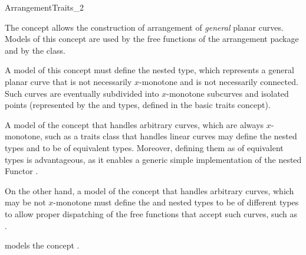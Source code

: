 
\ccRefPageBegin
\begin{ccRefConcept}{ArrangementTraits_2}

\ccDefinition
The concept \ccRefName{} allows the construction of arrangement
of {\sl general} planar curves. Models of this concept are used
by the free  functions of the arrangement package and
by the  class.

A model of this concept must define the nested  type, which
represents a general planar curve that is not necessarily $x$-monotone
and is not necessarily connected. Such curves are eventually subdivided into
$x$-monotone subcurves and isolated points (represented by the 
and  types, defined in the basic traits concept).

A model of the concept \ccRefName{} that handles arbitrary curves,
which are always $x$-monotone, such as a traits class that handles
linear curves may define the nested types  and
 to be of equivalent types. Moreover, defining
them as of equivalent types is advantageous, as it enables a generic
simple implementation of the nested Functor
.

On the other hand, a model of the \ccRefName{} concept that handles
arbitrary curves, which may be not $x$-monotone must define the
 and  nested types to be of
different types to allow proper dispatching of the free functions
that accept such curves, such as .

\ccRefines
{}

\ccTypes

\ccThreeToTwo
{}%
  {models the concept .}


 {}


\end{ccRefConcept}
